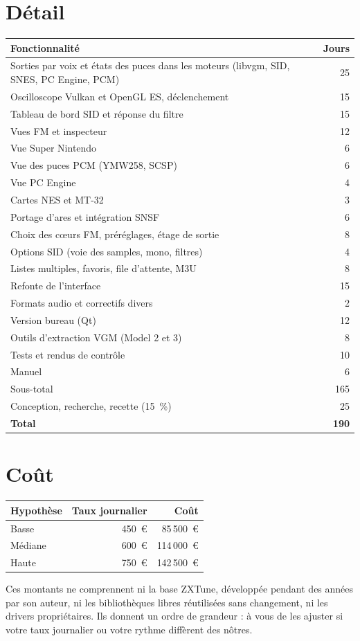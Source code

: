 \section{Détail}
\begin{longtable}{@{}p{} r@{}}
\toprule \textbf{Fonctionnalité} & \textbf{Jours} \\ \midrule
Sorties par voix et états des puces dans les moteurs (libvgm, SID, SNES, PC Engine, PCM) & 25 \\
Oscilloscope Vulkan et OpenGL ES, déclenchement & 15 \\
Tableau de bord SID et réponse du filtre & 15 \\
Vues FM et inspecteur & 12 \\
Vue Super Nintendo & 6 \\
Vue des puces PCM (YMW258, SCSP) & 6 \\
Vue PC Engine & 4 \\
Cartes NES et MT-32 & 3 \\
Portage d'ares et intégration SNSF & 6 \\
Choix des cœurs FM, préréglages, étage de sortie & 8 \\
Options SID (voie des samples, mono, filtres) & 4 \\
Listes multiples, favoris, file d'attente, M3U & 8 \\
Refonte de l'interface & 15 \\
Formats audio et correctifs divers & 2 \\
Version bureau (Qt) & 12 \\
Outils d'extraction VGM (Model 2 et 3) & 8 \\
Tests et rendus de contrôle & 10 \\
Manuel & 6 \\ \midrule
Sous-total & 165 \\
Conception, recherche, recette (15~\%) & 25 \\ \midrule
\textbf{Total} & \textbf{190} \\
\bottomrule
\end{longtable}

\section{Coût}
\begin{longtable}{@{}l r r@{}}
\toprule \textbf{Hypothèse} & \textbf{Taux journalier} & \textbf{Coût} \\ \midrule
Basse & 450~€ & 85\,500~€ \\
Médiane & 600~€ & 114\,000~€ \\
Haute & 750~€ & 142\,500~€ \\
\bottomrule
\end{longtable}

Ces montants ne comprennent ni la base ZXTune, développée pendant des années par son auteur, ni les bibliothèques
libres réutilisées sans changement, ni les drivers propriétaires. Ils donnent un ordre de grandeur : à vous de les
ajuster si votre taux journalier ou votre rythme diffèrent des nôtres.
